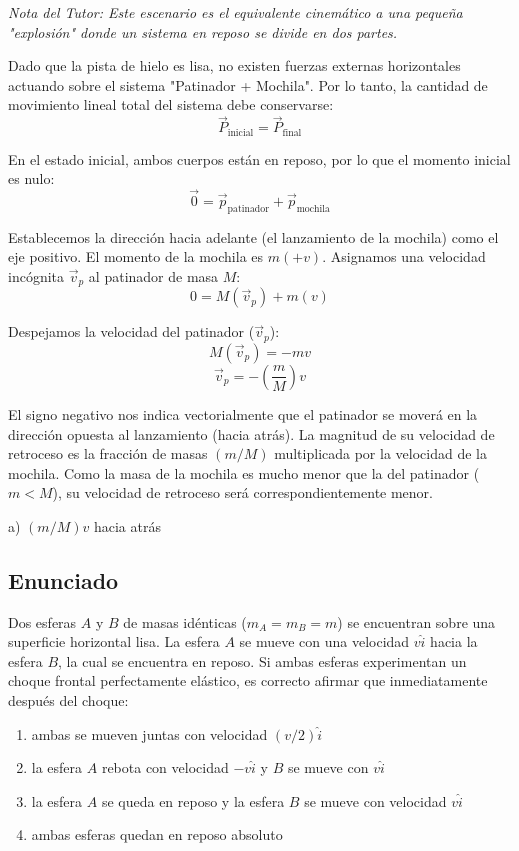 \documentclass[12pt, a4paper]{article}
\begin{document}
\textit{Nota del Tutor: Este escenario es el equivalente cinemático a una pequeña "explosión" donde un sistema en reposo se divide en dos partes.}

Dado que la pista de hielo es lisa, no existen fuerzas externas horizontales actuando sobre el sistema "Patinador + Mochila". Por lo tanto, la cantidad de movimiento lineal total del sistema debe conservarse:
$$ \vec{P}_{\text{inicial}} = \vec{P}_{\text{final}} $$

En el estado inicial, ambos cuerpos están en reposo, por lo que el momento inicial es nulo:
$$ \vec{0} = \vec{p}_{\text{patinador}} + \vec{p}_{\text{mochila}} $$

Establecemos la dirección hacia adelante (el lanzamiento de la mochila) como el eje positivo. El momento de la mochila es $m(+v)$. Asignamos una velocidad incógnita $\vec{v}_p$ al patinador de masa $M$:
$$ 0 = M(\vec{v}_p) + m(v) $$

Despejamos la velocidad del patinador ($\vec{v}_p$):
$$ M(\vec{v}_p) = -mv $$
$$ \vec{v}_p = -\left(\frac{m}{M}\right)v $$

El signo negativo nos indica vectorialmente que el patinador se moverá en la dirección opuesta al lanzamiento (hacia atrás). La magnitud de su velocidad de retroceso es la fracción de masas $(m/M)$ multiplicada por la velocidad de la mochila. Como la masa de la mochila es mucho menor que la del patinador ($m < M$), su velocidad de retroceso será correspondientemente menor.

\begin{tcolorbox}[colback=green!5!white, colframe=green!50!black, title=Respuesta Final]
\centering \Large a) $(m/M)v$ hacia atrás
\end{tcolorbox}

\newpage

\subsection*{Enunciado}
Dos esferas $A$ y $B$ de masas idénticas ($m_A = m_B = m$) se encuentran sobre una superficie horizontal lisa. La esfera $A$ se mueve con una velocidad $v\hat{i}$ hacia la esfera $B$, la cual se encuentra en reposo. Si ambas esferas experimentan un choque frontal perfectamente elástico, es correcto afirmar que inmediatamente después del choque:
\begin{enumerate}[label=\alph*)]
    \item ambas se mueven juntas con velocidad $(v/2)\hat{i}$
    \item la esfera $A$ rebota con velocidad $-v\hat{i}$ y $B$ se mueve con $v\hat{i}$
    \item la esfera $A$ se queda en reposo y la esfera $B$ se mueve con velocidad $v\hat{i}$
    \item ambas esferas quedan en reposo absoluto
\end{enumerate}
\end{document}
